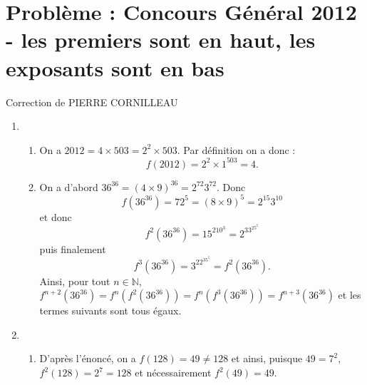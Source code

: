 \documentclass[10pt,a4paper]{article}
\begin{document}
\section{Problème : Concours Général 2012 - les premiers sont en haut, les exposants sont en bas}
Correction de PIERRE CORNILLEAU
\noindent
\begin{enumerate}
\item
\begin{enumerate}
\item On a $2012=4\times 503=2^2\times 503$. Par définition on a donc :
$$\boxed{f(2012)=2^2\times 1^{503}=4.}$$
\item On a d'abord $36^{36}=(4\times 9)^{36}=2^{72}3^{72}$. Donc 
$$\boxed{f(36^{36})=72^5=(8\times 9)^5=2^{15}3^{10}}$$
et donc
$$\boxed{f^2(36^{36})=15^210^3=2^33^25^5}$$
puis finalement
$$\boxed{f^3(36^{36})=3^22^35^5=f^2(36^{36}).}$$
Ainsi, pour tout $n\in\mathbb{N}$, $f^{n+2}(36^{36})=f^n(f^2(36^{36}))=f^n(f^3(36^{36}))=f^{n+3}(36^{36})$ et les termes suivants sont tous égaux.
\end{enumerate}
\item
\begin{enumerate}
\item D'après l'énoncé, on a $f(128)=49\neq 128$ et ainsi, puisque $49=7^2$, $f^2(128)=2^7=128$ et nécessairement $f^2(49)=49$.


\end{enumerate}
\end{enumerate}
\end{document}
